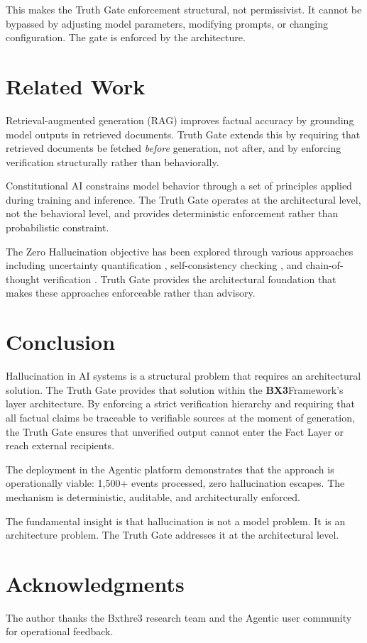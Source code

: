 \documentclass[12pt]{article}
\newcommand{\bxthree}{\textbf{BX3}}
\begin{document}
This makes the Truth Gate enforcement structural, not permissivist. It cannot be bypassed by adjusting model parameters, modifying prompts, or changing configuration. The gate is enforced by the architecture.

\section{Related Work}
\label{sec:prior}

Retrieval-augmented generation (RAG) \cite{lewis2020rag} improves factual accuracy by grounding model outputs in retrieved documents. Truth Gate extends this by requiring that retrieved documents be fetched \textit{before} generation, not after, and by enforcing verification structurally rather than behaviorally.

Constitutional AI \cite{anthropic2022cai} constrains model behavior through a set of principles applied during training and inference. The Truth Gate operates at the architectural level, not the behavioral level, and provides deterministic enforcement rather than probabilistic constraint.

The Zero Hallucination objective has been explored through various approaches including uncertainty quantification \cite{kadra2021}, self-consistency checking \cite{wang2022self}, and chain-of-thought verification \cite{stein2021}. Truth Gate provides the architectural foundation that makes these approaches enforceable rather than advisory.

\section{Conclusion}
\label{sec:conclusion}

Hallucination in AI systems is a structural problem that requires an architectural solution. The Truth Gate provides that solution within the \bxthree Framework's layer architecture. By enforcing a strict verification hierarchy and requiring that all factual claims be traceable to verifiable sources at the moment of generation, the Truth Gate ensures that unverified output cannot enter the Fact Layer or reach external recipients.

The deployment in the Agentic platform demonstrates that the approach is operationally viable: 1,500+ events processed, zero hallucination escapes. The mechanism is deterministic, auditable, and architecturally enforced.

The fundamental insight is that hallucination is not a model problem. It is an architecture problem. The Truth Gate addresses it at the architectural level.

\section*{Acknowledgments}
The author thanks the Bxthre3 research team and the Agentic user community for operational feedback.



\end{document}
